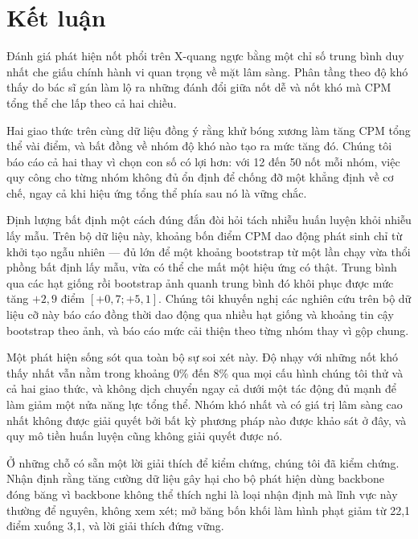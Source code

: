 \documentclass[12pt,a4paper]{article}
\begin{document}
\section{Kết luận}

Đánh giá phát hiện nốt phổi trên X-quang ngực bằng một chỉ số trung bình duy nhất
che giấu chính hành vi quan trọng về mặt lâm sàng. Phân tầng theo độ khó thấy do
bác sĩ gán làm lộ ra những đánh đổi giữa nốt dễ và nốt khó mà CPM tổng thể che
lấp theo cả hai chiều.

Hai giao thức trên cùng dữ liệu đồng ý rằng khử bóng xương làm tăng CPM tổng thể
vài điểm, và bất đồng về nhóm độ khó nào tạo ra mức tăng đó. Chúng tôi báo cáo cả
hai thay vì chọn con số có lợi hơn: với 12 đến 50 nốt mỗi nhóm, việc quy công cho
từng nhóm không đủ ổn định để chống đỡ một khẳng định về cơ chế, ngay cả khi hiệu
ứng tổng thể phía sau nó là vững chắc.

Định lượng bất định một cách đúng đắn đòi hỏi tách nhiễu huấn luyện khỏi nhiễu
lấy mẫu. Trên bộ dữ liệu này, khoảng bốn điểm CPM dao động phát sinh chỉ từ khởi
tạo ngẫu nhiên --- đủ lớn để một khoảng bootstrap từ một lần chạy vừa thổi phồng
bất định lấy mẫu, vừa có thể che mất một hiệu ứng có thật. Trung bình qua các hạt
giống rồi bootstrap ảnh quanh trung bình đó khôi phục được mức tăng $+2{,}9$ điểm
$[+0{,}7; +5{,}1]$. Chúng tôi khuyến nghị các nghiên cứu trên bộ dữ liệu cỡ này
báo cáo đồng thời dao động qua nhiều hạt giống và khoảng tin cậy bootstrap theo
ảnh, và báo cáo mức cải thiện theo từng nhóm thay vì gộp chung.

Một phát hiện sống sót qua toàn bộ sự soi xét này. Độ nhạy với những nốt khó thấy
nhất vẫn nằm trong khoảng 0\% đến 8\% qua mọi cấu hình chúng tôi thử và cả hai
giao thức, và không dịch chuyển ngay cả dưới một tác động đủ mạnh để làm giảm một
nửa năng lực tổng thể. Nhóm khó nhất và có giá trị lâm sàng cao nhất không được
giải quyết bởi bất kỳ phương pháp nào được khảo sát ở đây, và quy mô tiền huấn
luyện cũng không giải quyết được nó.

Ở những chỗ có sẵn một lời giải thích để kiểm chứng, chúng tôi đã kiểm chứng. Nhận
định rằng tăng cường dữ liệu gây hại cho bộ phát hiện dùng backbone đóng băng vì
backbone không thể thích nghi là loại nhận định mà lĩnh vực này thường để nguyên,
không xem xét; mở băng bốn khối làm hình phạt giảm từ 22,1 điểm xuống 3,1, và lời
giải thích đứng vững.

\end{document}
